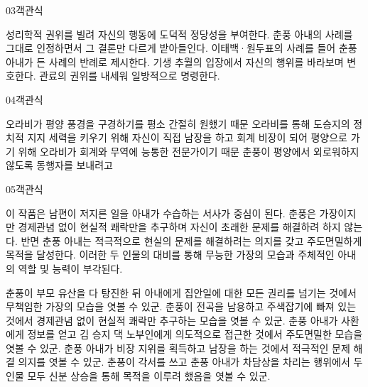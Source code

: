 \documentclass[fs85,seriesWit]{korfarm-base}
\begin{document}
\begin{kfQBlock}{03}{객관식}
\begin{kfChoices}
\kfChoice 성리학적 권위를 빌려 자신의 행동에 도덕적 정당성을 부여한다.
\kfChoice 춘풍 아내의 사례를 그대로 인정하면서 그 결론만 다르게 받아들인다.
\kfChoice 이태백·원두표의 사례를 들어 춘풍 아내가 든 사례의 반례로 제시한다.
\kfChoice 기생 추월의 입장에서 자신의 행위를 바라보며 변호한다.
\kfChoice 관료의 권위를 내세워 일방적으로 명령한다.
\end{kfChoices}
\end{kfQBlock}

\begin{kfQBlock}{04}{객관식}
\begin{kfChoices}
\kfChoice 오라비가 평양 풍경을 구경하기를 평소 간절히 원했기 때문
\kfChoice 오라비를 통해 도승지의 정치적 지지 세력을 키우기 위해
\kfChoice 자신이 직접 남장을 하고 회계 비장이 되어 평양으로 가기 위해
\kfChoice 오라비가 회계와 무역에 능통한 전문가이기 때문
\kfChoice 춘풍이 평양에서 외로워하지 않도록 동행자를 보내려고
\end{kfChoices}
\end{kfQBlock}

\begin{kfQBlock}{05}{객관식}
\begin{kfEvidence}이 작품은 남편이 저지른 일을 아내가 수습하는 서사가 중심이 된다. 춘풍은 가장이지만 경제관념 없이 현실적 쾌락만을 추구하며 자신이 초래한 문제를 해결하려 하지 않는다. 반면 춘풍 아내는 적극적으로 현실의 문제를 해결하려는 의지를 갖고 주도면밀하게 목적을 달성한다. 이러한 두 인물의 대비를 통해 무능한 가장의 모습과 주체적인 아내의 역할 및 능력이 부각된다.\end{kfEvidence}
\begin{kfChoices}
\kfChoice 춘풍이 부모 유산을 다 탕진한 뒤 아내에게 집안일에 대한 모든 권리를 넘기는 것에서 무책임한 가장의 모습을 엿볼 수 있군.
\kfChoice 춘풍이 전곡을 남용하고 주색잡기에 빠져 있는 것에서 경제관념 없이 현실적 쾌락만 추구하는 모습을 엿볼 수 있군.
\kfChoice 춘풍 아내가 사환에게 정보를 얻고 김 승지 댁 노부인에게 의도적으로 접근한 것에서 주도면밀한 모습을 엿볼 수 있군.
\kfChoice 춘풍 아내가 비장 지위를 획득하고 남장을 하는 것에서 적극적인 문제 해결 의지를 엿볼 수 있군.
\kfChoice 춘풍이 각서를 쓰고 춘풍 아내가 차담상을 차리는 행위에서 두 인물 모두 신분 상승을 통해 목적을 이루려 했음을 엿볼 수 있군.
\end{kfChoices}
\end{kfQBlock}
\end{document}
